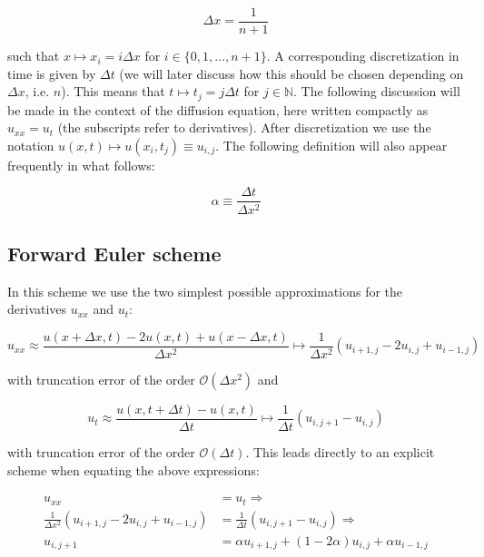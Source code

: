 \documentclass[a4paper, 11pt, notitlepage,english]{article}
\begin{document}
\begin{equation}
 \Delta x = \frac{1}{n+1}
\label{eq:Step_length}
\end{equation}

such that $x \mapsto x_i = i\Delta x$ for $i \in \{0,1,\dots,n+1 \}$. A corresponding discretization in time is given by $\Delta t$ (we will later discuss how this should be chosen depending on $\Delta x$, i.e. $n$). This means that $t\mapsto t_j = j\Delta t$ for $j\in \mathbb{N}$. The following discussion will be made in the context of the diffusion equation, here written compactly as $u_{xx} = u_t$ (the subscripts refer to derivatives). After discretization we use the notation $u(x,t) \mapsto u(x_i, t_j) \equiv u_{i,j}$. The following definition will also appear frequently in what follows:

\begin{equation}
 \alpha \equiv \frac{\Delta t}{\Delta x^2}
\label{eq:Step_parameter}
\end{equation}

\subsection{Forward Euler scheme}
In this scheme we use the two simplest possible approximations for the derivatives $u_{xx}$ and $u_t$:

\begin{equation}
u_{xx} \approx \frac{u(x+\Delta x,t)-2u(x,t)+u(x-\Delta x, t)}{\Delta x^2} \mapsto \frac{1}{\Delta x^2} (u_{i+1,j}-2u_{i,j}+u_{i-1,j})
\label{eq:Forward_uxx}
\end{equation}

with truncation error of the order $\mathcal{O}(\Delta x^2)$ and

\begin{equation}
u_{t} \approx \frac{u(x,t+\Delta t)-u(x, t)}{\Delta t} \mapsto \frac{1}{\Delta t} (u_{i,j+1}-u_{i,j})
\label{eq:Forward_ut}
\end{equation}

with truncation error of the order $\mathcal{O}(\Delta t)$. This leads directly to an explicit scheme when equating the above expressions:

\begin{align}
u_{xx} &= u_t \Rightarrow \\
 \frac{1}{\Delta x^2} (u_{i+1,j}-2u_{i,j}+u_{i-1,j}) &= \frac{1}{\Delta t} (u_{i,j+1}-u_{i,j}) \Rightarrow \\
 u_{i,j+1} &= \alpha u_{i+1,j} + (1-2\alpha)u_{i,j} + \alpha u_{i-1,j}
\label{eq:Forward_Euler_scheme}
\end{align}
\end{document}
